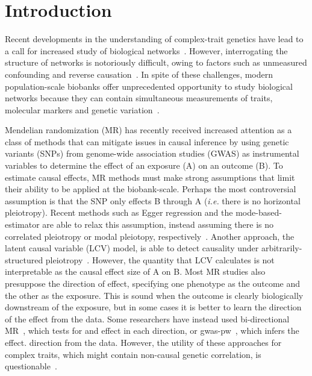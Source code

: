 \documentclass{article}
\begin{document}
\newpage
\section{Introduction}
Recent developments in the understanding of complex-trait genetics have
lead to a call for increased study of biological networks~\cite{Boyle2017,Liu2019,Wray2018}.
However, interrogating the structure of networks is notoriously difficult,
owing to factors such as unmeasured confounding and reverse causation~\cite{Parsana2019}.
In spite of these challenges, modern population-scale biobanks 
offer unprecedented opportunity to study biological networks
 because they can contain simultaneous measurements of
traits, molecular markers and genetic variation~\cite{Sudlow2015,Nagai2017}.

Mendelian randomization (MR) has recently received increased attention as a class of methods
that can mitigate issues in causal inference
 by using genetic variants (SNPs) from genome-wide
association studies (GWAS) as instrumental variables to determine the effect
of an exposure (A) on an outcome (B). To estimate causal effects,
MR methods must make strong assumptions that limit their
ability to be applied at the biobank-scale. Perhaps the most
controversial assumption is that the SNP only effects B through A
(\textit{i.e.} there is no horizontal pleiotropy). Recent methods such as Egger
regression and the mode-based-estimator are able to relax this assumption, instead
assuming there is no correlated pleiotropy or modal pleiotopy, respectively~\cite{Bowden2015,Hartwig2017}.
Another approach, the latent causal variable (LCV) model, is able to detect causality
under arbitrarily-structured pleiotropy~\cite{OConnor2018}. However, the quantity that LCV
calculates is not interpretable as the causal effect size of A on B. Most MR studies
also presuppose the direction of effect, specifying one phenotype as the outcome and
the other as the exposure. This is sound when the outcome
is clearly biologically downstream of the exposure, but in some cases it is better
to learn the direction of the effect from the data.
Some researchers have instead used bi-directional MR~\cite{Timpson2011}, which tests for
and effect in each direction, or gwas-pw~\cite{Pickrell2016}, which infers the effect.
direction from the data.
However, the utility of these approaches for complex traits,
which might contain non-causal genetic correlation,
is questionable~\cite{OConnor2018}.
\end{document}
